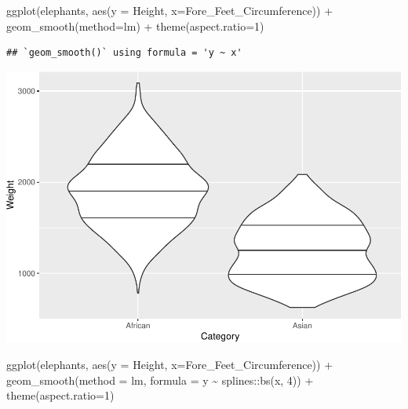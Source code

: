 \documentclass[
]{book}
\newenvironment{Shaded}{\begin{snugshade}}{\end{snugshade}}
\newcommand{\AttributeTok}[1]{\textcolor[rgb]{0.77,0.63,0.00}{#1}}
\newcommand{\DecValTok}[1]{\textcolor[rgb]{0.00,0.00,0.81}{#1}}
\newcommand{\FunctionTok}[1]{\textcolor[rgb]{0.00,0.00,0.00}{#1}}
\newcommand{\NormalTok}[1]{#1}
\newcommand{\SpecialCharTok}[1]{\textcolor[rgb]{0.00,0.00,0.00}{#1}}
\begin{document}
\begin{Shaded}
\begin{Highlighting}[]
\FunctionTok{ggplot}\NormalTok{(elephants, }\FunctionTok{aes}\NormalTok{(}\AttributeTok{y =}\NormalTok{ Height, }\AttributeTok{x=}\NormalTok{Fore\_Feet\_Circumference)) }\SpecialCharTok{+} 
  \FunctionTok{geom\_smooth}\NormalTok{(}\AttributeTok{method=}\NormalTok{lm) }\SpecialCharTok{+} 
  \FunctionTok{theme}\NormalTok{(}\AttributeTok{aspect.ratio=}\DecValTok{1}\NormalTok{)}
\end{Highlighting}
\end{Shaded}

\begin{verbatim}
## `geom_smooth()` using formula = 'y ~ x'
\end{verbatim}

\includegraphics{Data-Visualisation-geom-Encyclopedia_files/figure-latex/unnamed-chunk-53-1.pdf}

\begin{Shaded}
\begin{Highlighting}[]
\FunctionTok{ggplot}\NormalTok{(elephants, }\FunctionTok{aes}\NormalTok{(}\AttributeTok{y =}\NormalTok{ Height, }\AttributeTok{x=}\NormalTok{Fore\_Feet\_Circumference)) }\SpecialCharTok{+} 
  \FunctionTok{geom\_smooth}\NormalTok{(}\AttributeTok{method =}\NormalTok{ lm, }\AttributeTok{formula =}\NormalTok{ y }\SpecialCharTok{\textasciitilde{}}\NormalTok{ splines}\SpecialCharTok{::}\FunctionTok{bs}\NormalTok{(x, }\DecValTok{4}\NormalTok{)) }\SpecialCharTok{+} \FunctionTok{theme}\NormalTok{(}\AttributeTok{aspect.ratio=}\DecValTok{1}\NormalTok{)}
\end{Highlighting}
\end{Shaded}
\end{document}
